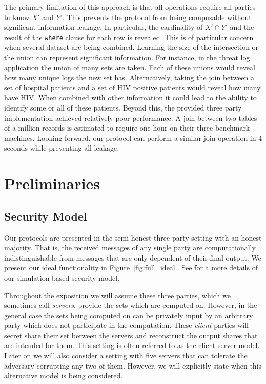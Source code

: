 \documentclass[11pt,letterpaper]{article}
\newcommand{\namedref}[2]{\hyperref[#2]{#1~\ref*{#2}}}
\newcommand{\figureref}[1]{\namedref{Figure}{#1}}
\begin{document}
The primary limitation of this approach is that all operations require all parties to know $X'$ and $Y'$. This prevents the protocol from being composable without significant information leakage. In particular, the cardinality of $X'\cap Y'$ and the result of the \texttt{where} clause for each row is revealed. This is of particular concern when several dataset are being combined. Learning the size of the intersection or the union can represent significant information. For instance, in the threat log application the union of many sets are taken. Each of these unions would reveal how many unique logs the new set has. Alternatively, taking the join between a set of hospital patients and a set of HIV positive patients would reveal how many have HIV. When combined with other information it could lead to the ability to identify some or all of these patients. Beyond this, the provided three party implementation achieved relatively poor performance. A join between two tables of a million records is estimated to require one hour on their three benchmark machines\cite{LTW13}. Looking forward, our protocol can perform a similar join operation in 4 seconds while preventing all leakage. 


%
  
\section{Preliminaries} \label{sec:prelim}


\subsection{Security Model}

Our protocols are presented in the semi-honest three-party setting with an honest majority. That is, the received messages of any single party are computationally indistinguishable from messages that are only dependent of their final output. We present our ideal functionality in \figureref{fig:full_ideal}. See \cite{highthroughput} for a more details of our simulation based security model. 


\iffullversion
Throughout the exposition we will assume these three parties, which we sometimes call \emph{servers}, provide the sets which are computed on. However, in the general case the sets being computed on can be privately input by an arbitrary party which does not participate in the computation. These \emph{client} parties will secret share their set between the servers and reconstruct the output shares that are intended for them. This setting is often referred to as the client server model\cite{aby3, secureML}. Later on we will also consider a setting with five servers that can tolerate the adversary corrupting any two of them. However, we will explicitly state when this alternative model is being considered.
\fi
\end{document}
